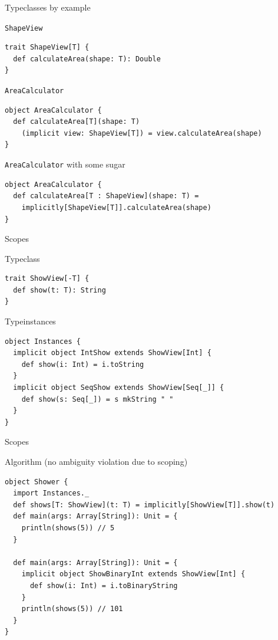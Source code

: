 \begin{frame}[fragile]{Typeclasses by example}
\begin{exampleblock}{\lstinline!ShapeView!}
\begin{lstlisting}
trait ShapeView[T] {
  def calculateArea(shape: T): Double
}
\end{lstlisting}
\end{exampleblock}
\begin{exampleblock}{\lstinline!AreaCalculator!}
\begin{lstlisting}
object AreaCalculator {
  def calculateArea[T](shape: T)
    (implicit view: ShapeView[T]) = view.calculateArea(shape)
}
\end{lstlisting}
\end{exampleblock}
\begin{exampleblock}{\lstinline!AreaCalculator! with some sugar}
\begin{lstlisting}
object AreaCalculator {
  def calculateArea[T : ShapeView](shape: T) =
    implicitly[ShapeView[T]].calculateArea(shape)
}
\end{lstlisting}
\end{exampleblock}
\end{frame}

\begin{frame}[fragile]{Scopes}
\begin{exampleblock}{Typeclass}
\begin{lstlisting}
trait ShowView[-T] {
  def show(t: T): String
}
\end{lstlisting}
\end{exampleblock}
\begin{exampleblock}{Typeinstances}
\begin{lstlisting}
object Instances {
  implicit object IntShow extends ShowView[Int] {
    def show(i: Int) = i.toString
  }
  implicit object SeqShow extends ShowView[Seq[_]] {
    def show(s: Seq[_]) = s mkString " "
  }
}
\end{lstlisting}
\end{exampleblock}
\end{frame}

\begin{frame}[fragile]{Scopes}
\begin{exampleblock}{Algorithm (no ambiguity violation due to scoping)}
\begin{lstlisting}
object Shower {
  import Instances._
  def shows[T: ShowView](t: T) = implicitly[ShowView[T]].show(t)
  def main(args: Array[String]): Unit = {
    println(shows(5)) // 5
  }

  def main(args: Array[String]): Unit = {
    implicit object ShowBinaryInt extends ShowView[Int] {
      def show(i: Int) = i.toBinaryString
    }
    println(shows(5)) // 101
  }
}
\end{lstlisting}
\end{exampleblock}
\end{frame}

